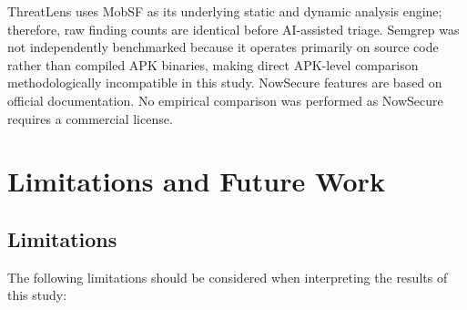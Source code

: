 \documentclass[preprint,12pt,a4paper]{elsarticle}
\begin{document}
\begin{table}[h]
\vspace{0.3em}

\footnotesize{
ThreatLens uses MobSF as its underlying static and dynamic analysis engine; therefore, raw finding counts are identical before AI-assisted triage. Semgrep was not independently benchmarked because it operates primarily on source code rather than compiled APK binaries, making direct APK-level comparison methodologically incompatible in this study.
NowSecure features are based on official documentation. No empirical comparison was performed as NowSecure requires a commercial license.
}
\end{table}



\section{Limitations and Future Work}

\subsection{Limitations}

The following limitations should be considered when interpreting the results of this study:
\end{document}
